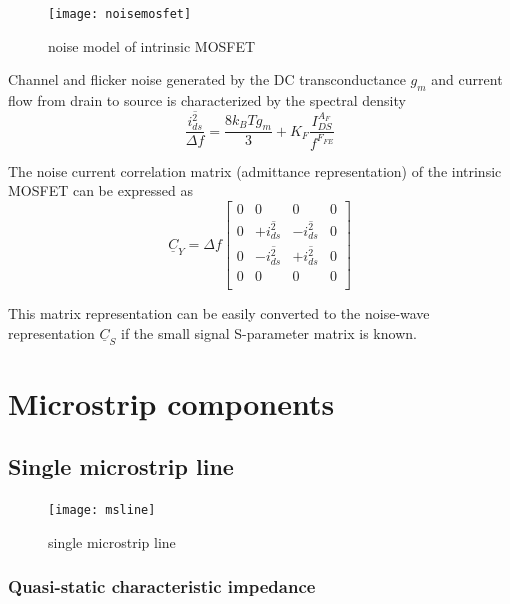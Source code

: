 \documentclass[10pt]{report}
\begin{document}
\begin{figure}[ht]
\begin{center}
\texttt{[image: noisemosfet]}
\end{center}
\caption{noise model of intrinsic MOSFET}
\label{fig:noisemosfet}
\end{figure}
\FloatBarrier

Channel and flicker noise generated by the DC transconductance $g_m$
and current flow from drain to source is characterized by the spectral
density
\begin{equation}
\dfrac{\overline{i_{ds}^2}}{\Delta f} = \dfrac{8 k_B T g_m}{3} + K_F\dfrac{I_{DS}^{A_F}}{f^{F_{FE}}}
\end{equation}

The noise current correlation matrix (admittance representation) of
the intrinsic MOSFET can be expressed as
\begin{equation}
\underline{C}_Y = \Delta f
\begin{bmatrix}
0 & 0 & 0 & 0\\
0 & +\overline{i_{ds}^2} & -\overline{i_{ds}^2} & 0\\
0 & -\overline{i_{ds}^2} & +\overline{i_{ds}^2} & 0\\
0 & 0 & 0 & 0\\
\end{bmatrix}
\end{equation}

This matrix representation can be easily converted to the noise-wave
representation $\underline{C}_S$ if the small signal S-parameter
matrix is known.

\chapter{Microstrip components}

\section{Single microstrip line}

\begin{figure}[ht]
\begin{center}
\texttt{[image: msline]}
\end{center}
\caption{single microstrip line}
\label{fig:MSline}
\end{figure}
\FloatBarrier

\subsection{Quasi-static characteristic impedance}
\end{document}
